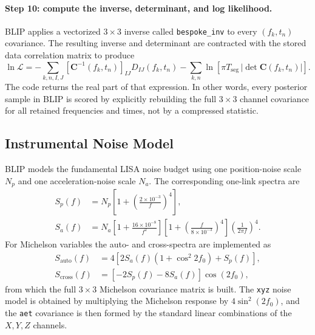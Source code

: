 \documentclass[11pt]{article}
\begin{document}
\paragraph{Step 10: compute the inverse, determinant, and log likelihood.}
BLIP applies a vectorized $3\times 3$ inverse called \texttt{bespoke\_inv} to every $(f_k,t_n)$ covariance. The resulting inverse and determinant are contracted with the stored data correlation matrix to produce
\begin{equation}
\ln \mathcal{L}
=-\sum_{k,n,I,J}
\left[\mathbf{C}^{-1}(f_k,t_n)\right]_{IJ}
D_{IJ}(f_k,t_n)
-\sum_{k,n}\ln\!\left[\pi T_{\mathrm{seg}}\,
\left|\det \mathbf{C}(f_k,t_n)\right|\right].
\end{equation}
The code returns the real part of that expression. In other words, every posterior sample in BLIP is scored by explicitly rebuilding the full $3\times 3$ channel covariance for all retained frequencies and times, not by a compressed statistic.

\subsection{Instrumental Noise Model}
BLIP models the fundamental LISA noise budget using one position-noise scale $N_p$ and one acceleration-noise scale $N_a$. The corresponding one-link spectra are
\begin{align}
S_p(f) &= N_p\left[1+\left(\frac{2\times10^{-3}}{f}\right)^4\right], \\
S_a(f) &= N_a\left[1+\frac{16\times10^{-8}}{f^2}\right]
\left[1+\left(\frac{f}{8\times10^{-3}}\right)^4\right]
\left(\frac{1}{2\pi f}\right)^4 .
\end{align}
For Michelson variables the auto- and cross-spectra are implemented as
\begin{align}
S_{\mathrm{auto}}(f) &= 4\left[2S_a(f)\left(1+\cos^2 2f_0\right)+S_p(f)\right], \\
S_{\mathrm{cross}}(f) &= \left[-2S_p(f)-8S_a(f)\right]\cos(2f_0),
\end{align}
from which the full $3\times3$ Michelson covariance matrix is built. The \texttt{xyz} noise model is obtained by multiplying the Michelson response by $4\sin^2(2f_0)$, and the \texttt{aet} covariance is then formed by the standard linear combinations of the $X,Y,Z$ channels.
\end{document}
